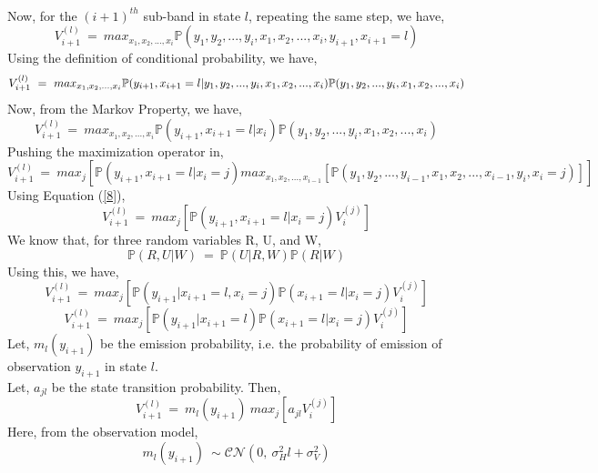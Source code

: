 \documentclass[12pt, draftcls, onecolumn]{IEEEtran}
\begin{document}
\\Now, for the $(i+1)^{th}$ sub-band in state $l$, repeating the same step, we have,
\begin{equation}\label{9}
    V_{i+1}^{(l)}\ =\ max_{x_1,x_2,...,x_i}\mathbb P(y_1,y_2,...,y_i,x_1,x_2,...,x_i,y_{i+1},x_{i+1}=l)
\end{equation}
Using the definition of conditional probability, we have,
\begin{equation}\label{10}
    V_{i+1}^{(l)}\ =\ max_{x_1,x_2,...,x_i}\mathbb P(y_{i+1},x_{i+1}=l|y_1,y_2,...,y_i,x_1,x_2,...,x_i)\\\mathbb P(y_1,y_2,...,y_i,x_1,x_2,...,x_i)
\end{equation}
Now, from the Markov Property, we have,
\begin{equation}\label{11}
    V_{i+1}^{(l)}\ =\ max_{x_1,x_2,...,x_i}\mathbb P(y_{i+1},x_{i+1}=l|x_i)\mathbb P(y_1,y_2,...,y_i,x_1,x_2,...,x_i)
\end{equation}
Pushing the maximization operator in,
\begin{equation}\label{12}
    V_{i+1}^{(l)}\ =\ max_{j}[\mathbb P(y_{i+1},x_{i+1}=l|x_i=j)max_{x_1,x_2,...,x_{i-1}}[\mathbb P(y_1,y_2,...,y_{i-1},x_1,x_2,...,x_{i-1},y_i,x_i=j)]]
\end{equation}
Using Equation (\ref{8}),
\begin{equation}\label{13}
    V_{i+1}^{(l)}\ =\ max_{j}[\mathbb P(y_{i+1},x_{i+1}=l|x_i=j)V_i^{(j)}]
\end{equation}
We know that, for three random variables R, U, and W,
\[\mathbb P(R,U|W)\ =\ \mathbb P(U|R,W)\mathbb P(R|W)\]
Using this, we have,
\begin{equation}\label{14}
    V_{i+1}^{(l)}\ =\ max_{j}[\mathbb P(y_{i+1}|x_{i+1}=l,x_i=j)\mathbb P(x_{i+1}=l|x_i=j)V_i^{(j)}]
\end{equation}
\begin{equation}\label{15}
    V_{i+1}^{(l)}\ =\ max_{j}[\mathbb P(y_{i+1}|x_{i+1}=l)\mathbb P(x_{i+1}=l|x_i=j)V_i^{(j)}]
\end{equation}
Let, $m_l(y_{i+1})$ be the emission probability, i.e. the probability of emission of observation $y_{i+1}$ in state $l$.
\\Let, $a_{jl}$ be the state transition probability.
Then, 
\begin{equation}\label{16}
    V_{i+1}^{(l)}\ =\ m_l(y_{i+1})\ max_{j}[a_{jl}V_i^{(j)}]
\end{equation}
Here, from the observation model,
\[m_l(y_{i+1})\ \sim \mathcal{CN}(0,\ \sigma_H^2l+\sigma_V^2)\]
\end{document}
